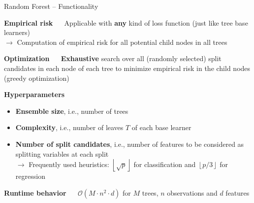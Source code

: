 \documentclass[11pt,compress,t,notes=noshow, xcolor=table]{beamer}
\newcommand{\highlight}[1]{\textcolor{highlightcol}{\textbf{#1}}}
\begin{document}
\begin{frame}{Random Forest -- Functionality}

\footnotesize

\highlight{Empirical risk} ~~
Applicable with \textbf{any} kind of loss function (just like tree base 
learners) \\
$\rightarrow$ Computation of empirical risk for all potential child nodes in all 
trees

\medskip

\highlight{Optimization} ~~ \textbf{Exhaustive} search over
all (randomly selected) split candidates in each node of each tree to minimize
empirical risk in the child nodes (greedy optimization) \\

\medskip

\highlight{Hyperparameters}

\begin{itemize}
  \item \textbf{Ensemble size}, i.e., number of trees
  \item \textbf{Complexity}, i.e., number of leaves $T$ of each base learner
  \item \textbf{Number of split candidates}, i.e., number of features to be
  considered as splitting variables at each split \\
  $\rightarrow$ Frequently used heuristics: 
  $\left \lfloor{\sqrt{p}}\right \rfloor$ for classification and
  $\left \lfloor{p/3}\right \rfloor$ for regression
\end{itemize}

\medskip

\highlight{Runtime behavior} ~~ $\mathcal{O}(M \cdot n^2 \cdot d)$ 
for $M$ trees, $n$ observations and $d$ features
  
\end{frame}


\end{document}
